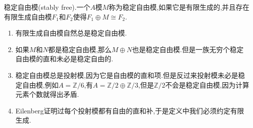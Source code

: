 稳定自由模(stably free).一个$A$模$M$称为稳定自由模,如果它是有限生成的,并且存在有限生成自由模$F_1$和$F_2$使得$F_1\oplus M\cong F_2$.
\begin{enumerate}
	\item 有限生成自由模自然总是稳定自由模.
	\item 如果$M$和$N$都是稳定自由模,那么$M\oplus N$也是稳定自由模.但是一族无穷个稳定自由模的直和未必是稳定自由的.
	\item 稳定自由模总是投射模,因为它是自由模的直和项.但是反过来投射模未必是稳定自由模,例如$A=\mathbb{Z}/6$,有$A=\mathbb{Z}/2\oplus\mathbb{Z}/3$,但是$\mathbb{Z}/2$不会是稳定自由模,因为计算元素个数就得出矛盾.
	\item Eilenberg证明过每个投射模都有自由的直和补,于是定义中我们必须约定有限生成.
\end{enumerate}

